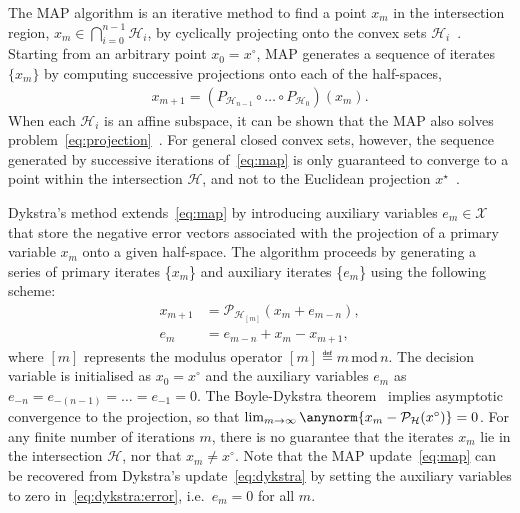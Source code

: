 \documentclass[onecolumn]{autart}
\begin{document}
The MAP algorithm is an iterative method to find a point $x_m$ in the intersection region, $x_m  \in\bigcap_{i=0}^{n-1}\mathcal{H}_i$, by cyclically projecting onto the convex sets $\mathcal{H}_i$~\cite{NEUMANN,BREGMAN1965}. Starting from an arbitrary point $x_0=x^\circ$, MAP generates a sequence of iterates $\{x_m\}$ by computing successive projections onto each of the half-spaces,
\begin{align}\label{eq:map}
    x_{m+1} = (P_{\mathcal{H}_{n-1}} \circ \dots \circ P_{\mathcal{H}_0}) (x_m).
\end{align}
When each $\mathcal{H}_i$ is an affine subspace, it can be shown that the MAP also solves problem~\eqref{eq:projection}~\cite{NEUMANN}. For general closed convex sets, however, the sequence generated by successive iterations of~\eqref{eq:map} is only guaranteed to converge to a point within the intersection $\mathcal{H}$, and not to the Euclidean projection $x^\star$~\cite{BREGMAN1965}.

Dykstra's method extends~\eqref{eq:map} by introducing auxiliary variables $e_m \in \mathcal{X}$ that store the negative error vectors associated with the projection of a primary variable $x_m$ onto a given half-space. The algorithm proceeds by generating a series of primary iterates \{$x_{m}$\} and auxiliary iterates \{$e_{m}$\} using the following scheme:
\begin{subequations}\label{eq:dykstra}
\begin{align}
x_{m+1}&=\mathcal{P}_{\mathcal{H}_{[m]}}\left(x_{m}+e_{m-n}\right),\label{eq:dykstra:proj}\\
e_m&=e_{m-n}+x_{m}-x_{m+1}\label{eq:dykstra:error},
\end{align}
\end{subequations}
where $[m]$ represents the modulus operator $[m]\eqdef m \, \text{mod} \, n$. The decision variable is initialised as $x_0=x^\circ$ and the auxiliary variables $e_m$ as $e_{-n} = e_{-(n-1)} = \dots = e_{-1} = 0$.
The Boyle-Dykstra theorem~\cite{DYKSTRA,DYKSTRAPERKINS} implies asymptotic convergence to the projection, so that $\lim_{m\rightarrow\infty}\anynorm{x_m-\mathcal{P}_\mathcal{H}(x^\circ)}=0$. For any finite number of iterations $m$, there is no guarantee that the iterates $x_m$ lie in the intersection $\mathcal{H}$, nor that $x_m\neq x^\circ$. Note that the MAP update~\eqref{eq:map} can be recovered from Dykstra's update~\eqref{eq:dykstra} by setting the auxiliary variables to zero in~\eqref{eq:dykstra:error}, i.e.\ $e_m=0$ for all $m$.
\end{document}
